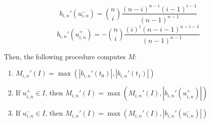 \documentclass {article}
\newcommand\bernstein[2]{b_{#1, #2}}
\begin{document}
$$
\bernstein{i}{n}' (u^-_{i,n}) = { n \choose i } \frac{(n-i)^{n-i} (i-1)^{i-1}}{(n-1)^{n-1}}
$$
$$
\bernstein{i}{n}' (u^+_{i,n}) = - { n \choose i } \frac{(i)^i (n-i-1)^{n-i-1}}{(n-1)^{n-1}}
$$

Then, the following procedure computes $M$:

\begin{enumerate}
  \item $ M_{i,n}'(I) = \max(|\bernstein{i}{n}' (t_0)|,|\bernstein{i}{n}' (t_1)|) $
  \item If $u^+_{i,n} \in I$, then $ M_{i,n}'(I) = \max(M_{i,n}'(I), |\bernstein{i}{n}' (u^+_{i,n})|)$
  \item If $u^-_{i,n} \in I$, then $ M_{i,n}'(I) = \max(M_{i,n}'(I), |\bernstein{i}{n}' (u^-_{i,n})|)$
\end{enumerate}
\end{document}
